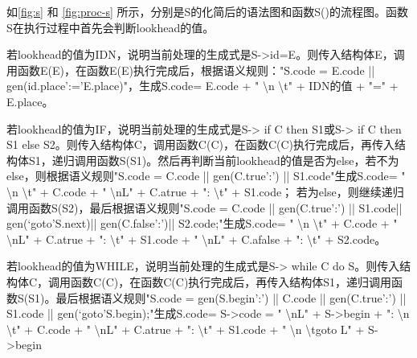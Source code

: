 \documentclass{ctexrep}
\begin{document}
如\cref{fig:s} 和 \cref{fig:proc-s} 所示，分别是S的化简后的语法图和函数S()的流程图。函数S在执行过程中首先会判断lookhead的值。

若lookhead的值为IDN，说明当前处理的生成式是S->id=E。则传入结构体E，调用函数E(E)，在函数E(E)执行完成后，根据语义规则："S.code = E.code || gen(id.place’:=’E.place)"，生成S.code= E.code + " \textbackslash{}n \textbackslash{}t" + IDN的值 + "=" + E.place。

若lookhead的值为IF，说明当前处理的生成式是S-> if C then S1或S-> if C then S1 else S2。则传入结构体C，调用函数C(C)，在函数C(C)执行完成后，再传入结构体S1，递归调用函数S(S1)。然后再判断当前lookhead的值是否为else，若不为else，则根据语义规则"S.code = C.code || gen(C.true’:’) || S1.code"生成S.code= " \textbackslash{}n \textbackslash{}t" + C.code + " \textbackslash{}nL" + C.atrue + ": \textbackslash{}t" + S1.code； 若为else，则继续递归调用函数S(S2)，最后根据语义规则"S.code = C.code || gen(C.true’:’) || S1.code|| gen(‘goto’S.next)|| gen(C.false’:’)|| S2.code;"生成S.code= " \textbackslash{}n \textbackslash{}t" + C.code + " \textbackslash{}nL" + C.atrue + ": \textbackslash{}t" + S1.code + " \textbackslash{}nL" + C.afalse + ": \textbackslash{}t" + S2.code。{\setlength{\emergencystretch}{.3em}\par}

若lookhead的值为WHILE，说明当前处理的生成式是S-> while C do S。则传入结构体C，调用函数C(C)，在函数C(C)执行完成后，再传入结构体S1，递归调用函数S(S1)。最后根据语义规则"S.code = gen(S.begin’:’) || C.code || gen(C.true’:’) || S1.code || gen(‘goto’S.begin);"生成S.code= S->code = " \textbackslash{}nL" + S->begin + ": \textbackslash{}n \textbackslash{}t" + C.code + " \textbackslash{}nL" + C.atrue + ": \textbackslash{}t" + S1.code + " \textbackslash{}n \textbackslash{}tgoto L" + S->begin{\setlength{\emergencystretch}{.14em}\par}
\end{document}
